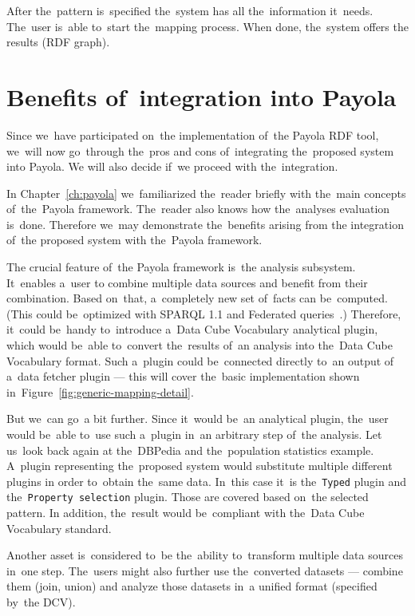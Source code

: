 After the~pattern is~specified the~system has all the~information it~needs. The~user is~able to~start the~mapping process. When done, the~system offers
the results (RDF graph).
\FloatBarrier

\section{Benefits of~integration into Payola}
\label{why-payola}
Since we~have participated on~the implementation of~the Payola RDF tool, we~will 
now go~through the~pros and cons of~integrating the~proposed system into Payola.
We will also decide if~we proceed with the~integration.

In Chapter~\ref{ch:payola} we~familiarized the~reader briefly with the~main
concepts of~the~Payola framework. The~reader also knows how the~analyses
evaluation is~done. Therefore we~may demonstrate the~benefits arising from
the integration of~the proposed system with the~Payola framework.

The crucial feature of~the Payola framework is~the analysis subsystem. It~enables a~user
to combine multiple data sources and benefit from their 
combination. Based on~that, a~completely new set of~facts can be~computed.
(This could be~optimized with SPARQL 1.1 and Federated queries~\cite{federated-queries}.) 
Therefore, it~could be~handy to~introduce a~Data Cube Vocabulary analytical 
plugin, which would be~able to~convert the~results of~an analysis into the~Data 
Cube Vocabulary format. Such a~plugin could be~connected directly to~an output
of a~data fetcher plugin --- this will cover the~basic implementation shown in~Figure~\ref{fig:generic-mapping-detail}.

But we~can go~a bit further. Since it~would be~an analytical plugin, the~user 
would be~able to~use such a~plugin in~an arbitrary step of~the analysis. Let us~look back again
at the~DBPedia and the~population statistics example. A~plugin representing the~proposed
system would substitute multiple different plugins 
in order to~obtain the~same data. In~this case it~is the~\texttt{Typed}
plugin and the~\texttt{Property selection} plugin. Those are covered based on~the selected pattern.
In addition, the~result would be~compliant with the~Data Cube Vocabulary standard.

Another asset is~considered to~be the~ability to~transform multiple data 
sources in~one step. The~users might also further use the~converted datasets --- combine them
(join, union) and analyze those datasets in~a unified format (specified by~the DCV).

